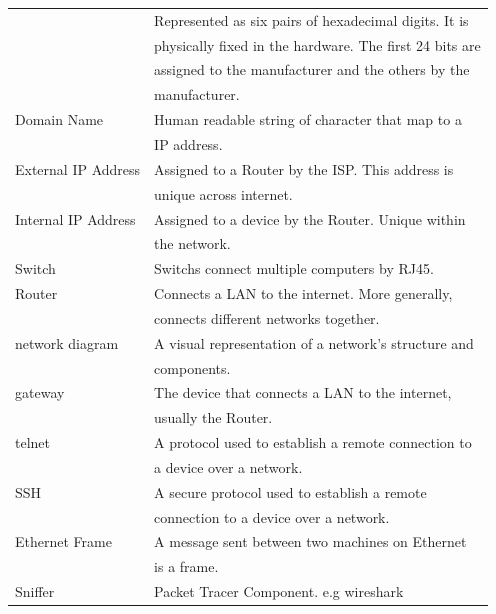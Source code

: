 \documentclass[5pt]{article}
\begin{document}
\begin{multicols}{2}
\begin{tabular}{LL}
                      & Represented as six pairs of hexadecimal digits. It is\\
                      & physically fixed in the hardware. The first 24 bits are\\
                      & assigned to the manufacturer and the others by the\\
                      & manufacturer.\\
  Domain Name         & Human readable string of character that map to a\\
                      & IP address. \\
  External IP Address & Assigned to a Router by the ISP. This address is\\
                      & unique across internet. \\
  Internal IP Address & Assigned to a device by the Router. Unique within\\
                      & the network. \\
  Switch              & Switchs connect multiple computers by RJ45. \\
  Router              & Connects a LAN to the internet. More generally,\\
                      & connects different networks together. \\
  network diagram     & A visual representation of a network's structure and\\
                      & components. \\
  gateway             & The device that connects a LAN to the internet,\\
                      & usually the Router. \\
  telnet              & A protocol used to establish a remote connection to\\
                      & a device over a network. \\
  SSH                 & A secure protocol used to establish a remote\\
                      & connection to a device over a network. \\
  Ethernet Frame      & A message sent between two machines on Ethernet\\
                      & is a frame.\\
  Sniffer             & Packet Tracer Component. e.g wireshark\\%
\end{tabular}


\end{multicols}
\end{document}
